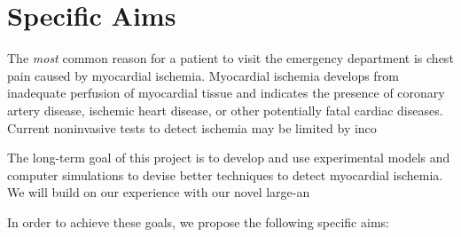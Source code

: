 %


%

\section{Specific Aims}

The \textit{most} common reason for a patient to visit the emergency
department is chest pain caused by myocardial ischemia. Myocardial ischemia
develops from inadequate perfusion of myocardial tissue and indicates the
presence of coronary artery disease, ischemic heart disease, or other
potentially fatal cardiac diseases. Current noninvasive tests to detect
ischemia may be limited by inco

The long-term goal of this project is to develop and use experimental
models and computer simulations to devise better techniques to detect
myocardial ischemia. We will build on our experience with our novel large-an


%

In order to achieve these goals, we propose the following specific aims: 
\vspace{-.1in} %

